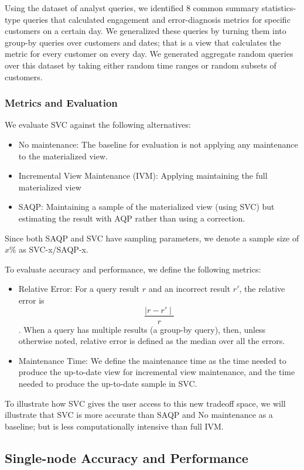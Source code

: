 Using the dataset of analyst queries, we identified 8 common summary statistics-type queries that calculated engagement and error-diagnosis metrics for specific customers on a certain day.
We generalized these queries by turning them into group-by queries over customers and dates; that is a view that calculates the metric for every customer on every day.
We generated aggregate random queries over this dataset by taking either random time ranges or random subsets of customers.

\subsubsection{Metrics and Evaluation}
We evaluate SVC against the following alternatives:
\begin{itemize}
\item No maintenance: The baseline for evaluation is not applying any maintenance to the materialized view.
\item Incremental View Maintenance (IVM): Applying maintaining the full materialized view
\item SAQP: Maintaining a sample of the materialized view (using SVC) but estimating the result with AQP rather than using 
a correction.
\end{itemize}
Since both SAQP and SVC have sampling parameters, we denote a sample size of $x \% $ as SVC-x/SAQP-x.

To evaluate accuracy and performance, we define the following metrics:
\begin{itemize}
\item Relative Error: For a query result $r$ and an incorrect result $r'$, the relative error is \[\frac{\mid r-r' \mid}{r}\]. 
When a query has multiple results (a group-by query), then, unless otherwise noted, relative error is defined as the median over all the errors.
\item Maintenance Time: We define the maintenance time as the time needed to produce the up-to-date view for incremental view maintenance, and the time needed to produce the up-to-date sample in SVC. 
\end{itemize}

To illustrate how SVC gives the user access to this new tradeoff space, we will illustrate that SVC is more accurate than SAQP and No maintenance as a baseline; but is less computationally intensive than full IVM. 

\subsection{Single-node Accuracy and Performance}

